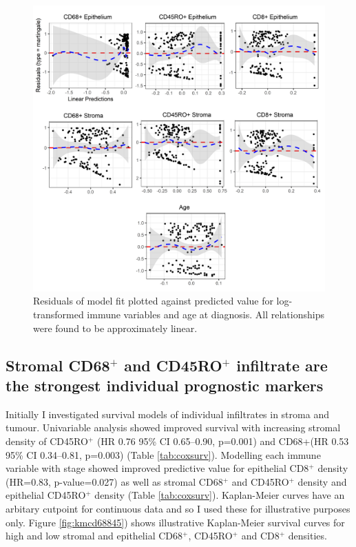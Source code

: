 \begin{figure}
    \centering
    \includegraphics[width=\textwidth]{Chapter2/Figs/Raster/modelfit_2-08.png}
    \caption[Residuals of model fit]{Residuals of model fit plotted against predicted value for log-transformed immune variables and age at diagnosis. All relationships were found to be approximately linear.}
    \label{fig:modelfit}
\end{figure}



\subsection[Prognostic value of individual infiltrates]{Stromal CD68$^+$ and CD45RO$^+$ infiltrate are the strongest individual prognostic markers}

Initially I investigated survival models of individual infiltrates in stroma and tumour. Univariable analysis showed improved survival with increasing stromal density of CD45RO$^+$ (HR 0.76 95\% CI 0.65–0.90, p=0.001) and CD68+(HR 0.53 95\% CI 0.34–0.81, p=0.003) (Table \ref{tab:coxsurv}). Modelling each immune variable with stage showed improved predictive value for epithelial CD8$^+$ density (HR=0.83, p-value=0.027) as well as stromal CD68$^+$ and CD45RO$^+$ density and epithelial CD45RO$^+$ density (Table  \ref{tab:coxsurv}). Kaplan-Meier curves have an arbitary cutpoint for continuous data and so I used these for illustrative purposes only. Figure \ref{fig:kmcd68845}) shows illustrative Kaplan-Meier survival curves for high and low stromal and epithelial CD68$^+$, CD45RO$^+$ and CD8$^+$ densities.\\

